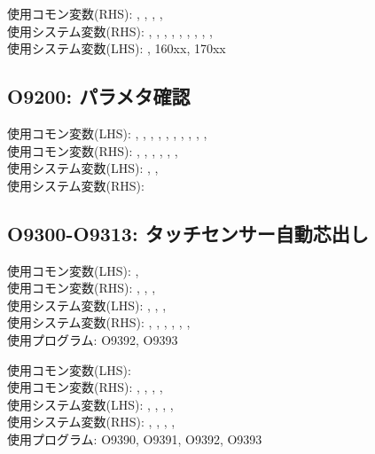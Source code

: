 \begin{hosoku}\small
使用コモン変数(RHS): , , , , \\
使用システム変数(RHS): , , , , , , , , , \\
使用システム変数(LHS): , \ttNum160xx, \ttNum170xx
\end{hosoku}

\subsection{O9200: パラメタ確認}
\begin{hosoku}\small
使用コモン変数(LHS): , , , , , , , , , , \\
使用コモン変数(RHS): , , , , , , \\
使用システム変数(LHS): , , \\
使用システム変数(RHS): 
\end{hosoku}

\subsection{O9300-O9313: タッチセンサー自動芯出し}
\begin{hosoku}\small
使用コモン変数(LHS): , \\
使用コモン変数(RHS): , , , \\
使用システム変数(LHS): , , , \\
使用システム変数(RHS): , , , , , , \\
使用プログラム: O9392, O9393
\end{hosoku}

\begin{hosoku}\small
使用コモン変数(LHS): \\
使用コモン変数(RHS): , , , , \\
使用システム変数(LHS): , , , , \\
使用システム変数(RHS): , , , , \\
使用プログラム: O9390, O9391, O9392, O9393
\end{hosoku}

